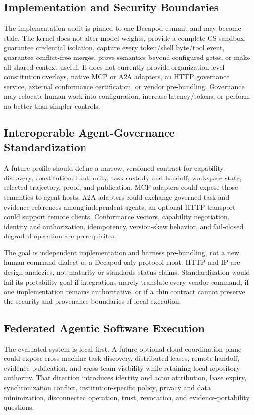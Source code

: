 \subsection{Implementation and Security Boundaries}
The implementation audit is pinned to one Decapod commit and may become stale. The kernel does not alter model weights, provide a complete OS sandbox, guarantee credential isolation, capture every token/shell byte/tool event, guarantee conflict-free merges, prove semantics beyond configured gates, or make all shared context useful. It does not currently provide organization-level constitution overlays, native MCP or A2A adapters, an HTTP governance service, external conformance certification, or vendor pre-bundling. Governance may relocate human work into configuration, increase latency/tokens, or perform no better than simpler controls.

\subsection{Interoperable Agent-Governance Standardization}
A future profile should define a narrow, versioned contract for capability discovery, constitutional authority, task custody and handoff, workspace state, selected trajectory, proof, and publication. MCP adapters could expose those semantics to agent hosts; A2A adapters could exchange governed task and evidence references among independent agents; an optional HTTP transport could support remote clients. Conformance vectors, capability negotiation, identity and authorization, idempotency, version-skew behavior, and fail-closed degraded operation are prerequisites.

The goal is independent implementation and harness pre-bundling, not a new human command dialect or a Decapod-only protocol moat. HTTP and IP are design analogies, not maturity or standards-status claims. Standardization would fail its portability goal if integrations merely translate every vendor command, if one implementation remains authoritative, or if a thin contract cannot preserve the security and provenance boundaries of local execution.

\subsection{Federated Agentic Software Execution}
The evaluated system is local-first. A future optional cloud coordination plane could expose cross-machine task discovery, distributed leases, remote handoff, evidence publication, and cross-team visibility while retaining local repository authority. That direction introduces identity and actor attribution, lease expiry, synchronization conflict, institution-specific policy, privacy and data minimization, disconnected operation, trust, revocation, and evidence-portability questions.

